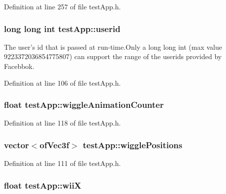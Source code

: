 Definition at line 257 of file test\-App.\-h.

\hypertarget{classtest_app_a6ae76dc97fbeee00755f4a6cd6b87e19}{
\subsubsection[{userid}]{\setlength{\rightskip}{0pt plus 5cm}long long int test\-App\-::userid}}\label{classtest_app_a6ae76dc97fbeee00755f4a6cd6b87e19}


The user's id that is passed at run-\/time.\-Only a long long int (max value 9223372036854775807) can support the range of the userids provided by Facebbok. 



Definition at line 106 of file test\-App.\-h.

\hypertarget{classtest_app_a6073b33be7847d675ec089a1d514c506}{
\subsubsection[{wiggle\-Animation\-Counter}]{\setlength{\rightskip}{0pt plus 5cm}float test\-App\-::wiggle\-Animation\-Counter}}\label{classtest_app_a6073b33be7847d675ec089a1d514c506}


Definition at line 118 of file test\-App.\-h.

\hypertarget{classtest_app_a5495d37f44bb3e3b00a04ad5910e0a6b}{
\subsubsection[{wiggle\-Positions}]{\setlength{\rightskip}{0pt plus 5cm}vector$<$of\-Vec3f$>$ test\-App\-::wiggle\-Positions}}\label{classtest_app_a5495d37f44bb3e3b00a04ad5910e0a6b}


Definition at line 111 of file test\-App.\-h.

\hypertarget{classtest_app_a7a77e8633c3a94e3e409a33a5cd9ae3f}{
\subsubsection[{wii\-X}]{\setlength{\rightskip}{0pt plus 5cm}float test\-App\-::wii\-X}}\label{classtest_app_a7a77e8633c3a94e3e409a33a5cd9ae3f}


